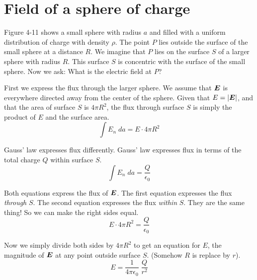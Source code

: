 \section{Field of a sphere of charge}

Figure 4-11 shows a small sphere with radius $a$
and filled with a uniform distribution of charge with density $\rho$.
The point $P$ lies outside the surface of the small sphere at a distance $R$.
We imagine that $P$ lies on the surface $S$ of a larger sphere with radius $R$.
This surface $S$ is concentric with the surface of the small sphere.
Now we ask: What is the electric field at $P$?

First we express the flux through the larger sphere.
We assume that $\boldsymbol{E}$ is everywhere directed away from the center of the sphere.
Given that $E = |\boldsymbol{E}|$, and that the area of surface $S$ is $4\pi R^2$, 
the flux through surface $S$ is simply the product of $E$ and the surface area.
\begin{equation*}
  \int E_n \; da = E \cdot 4 \pi R^2
\end{equation*}

Gauss' law expresses flux differently.
Gauss' law expresses flux in terms of the total charge $Q$ within surface $S$.
\begin{equation*}
  \int E_n \; da = \frac{Q}{\epsilon_0}
\end{equation*}

Both equations express the flux of $\boldsymbol{E}$.
The first equation expresses the flux \emph{through} $S$.
The second equation expresses the flux \emph{within} $S$.
They are the same thing! So we can make the right sides equal.
\begin{equation*}
  E \cdot 4 \pi R^2 = \frac{Q}{\epsilon_0}
\end{equation*}

Now we simply divide both sides by $4\pi R^2$ to get an equation for $E$,
the magnitude of $\boldsymbol{E}$ at any point outside surface $S$.
(Somehow $R$ is replace by $r$).
\begin{equation}
  E = \frac{1}{4\pi\epsilon_0} \; \frac{Q}{r^2}
\end{equation}

